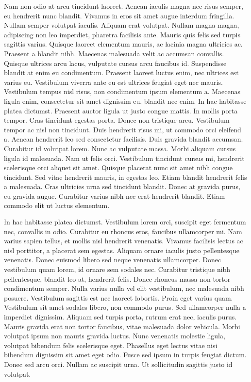 \documentclass[a4paper, 12pt, twoside]{book}
\begin{document}
Nam non odio at arcu tincidunt laoreet. Aenean iaculis magna nec risus semper, eu hendrerit nunc blandit. Vivamus in eros sit amet augue interdum fringilla. Nullam semper volutpat iaculis. Aliquam erat volutpat. Nullam magna magna, adipiscing non leo imperdiet, pharetra facilisis ante. Mauris quis felis sed turpis sagittis varius. Quisque laoreet elementum mauris, ac lacinia magna ultricies ac. Praesent a blandit nibh. Maecenas malesuada velit ac accumsan convallis. Quisque ultrices arcu lacus, vulputate cursus arcu faucibus id. Suspendisse blandit at enim eu condimentum. Praesent laoreet luctus enim, nec ultrices est varius eu. Vestibulum viverra ante eu est ultrices feugiat eget nec mauris. Vestibulum tempus nisl risus, non condimentum ipsum elementum a. Maecenas ligula enim, consectetur sit amet dignissim eu, blandit nec enim. In hac habitasse platea dictumst. Praesent auctor ligula ut justo congue mattis. In mollis porta tempor. Cras tincidunt egestas porta. Donec non tristique arcu. Vestibulum tempor ac nisl non tincidunt. Duis hendrerit risus mi, ut commodo orci eleifend a. Aenean hendrerit leo sed consectetur facilisis. Duis gravida blandit accumsan. Curabitur id volutpat lorem. Nunc ac vulputate massa. Morbi aliquam cursus ligula id malesuada. Nam ut felis orci. Vestibulum tincidunt cursus mi, hendrerit scelerisque orci aliquet sit amet. Quisque placerat nunc sit amet nibh congue tincidunt. Sed vitae hendrerit mauris, in egestas leo. Etiam blandit hendrerit felis a malesuada. Cras ultricies urna sed tincidunt blandit. Donec at gravida purus, eu gravida augue. Curabitur varius nibh nec erat hendrerit blandit. Etiam commodo elit ut luctus elementum.


In hac habitasse platea dictumst. Vestibulum lorem orci, suscipit eget fermentum nec, convallis in odio. Curabitur eu rhoncus eros, faucibus ullamcorper mi. Nam varius sapien tellus, et mollis nisl hendrerit venenatis. Vivamus facilisis lectus ac nisl porttitor, a placerat sem egestas. Aliquam ornare iaculis justo pellentesque venenatis. Donec euismod libero sed neque venenatis ullamcorper. Donec vestibulum quam lorem, id ornare sem sodales nec. Curabitur tristique nibh pellentesque, blandit leo at, hendrerit felis. Donec rhoncus massa non tortor condimentum semper. Nulla varius nulla vel elit vestibulum, nec malesuada nibh posuere. Vestibulum sagittis est nec laoreet lobortis. Proin eget varius quam. Vestibulum sit amet sodales libero, non commodo purus. Sed ullamcorper nulla a imperdiet dignissim. Aliquam sed turpis porta, rutrum erat nec, iaculis purus. Mauris gravida erat non tortor faucibus, vitae malesuada dolor vehicula. Morbi volutpat ipsum non mauris gravida luctus. Nunc venenatis molestie ligula, volutpat bibendum felis scelerisque eget. Phasellus eget lectus vitae nisi bibendum dignissim sit amet eget odio. Fusce sed ipsum in turpis feugiat dictum. Donec sed arcu orci. Nullam ac suscipit urna. Ut sollicitudin sagittis justo id volutpat.
\end{document}
